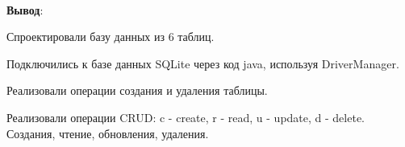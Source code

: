 \documentclass[12pt, a4paper, simple]{eskdtext}
\begin{document}

    \paragraph{} \textbf{Вывод}:
    
    Спроектировали базу данных из 6 таблиц.

    Подключились к базе данных SQLite через код java, используя DriverManager.

    Реализовали операции создания и удаления таблицы.

    Реализовали операции CRUD: c - create, r - read, u - update, d - delete.
    Создания, чтение, обновления, удаления.
    
\end{document}
